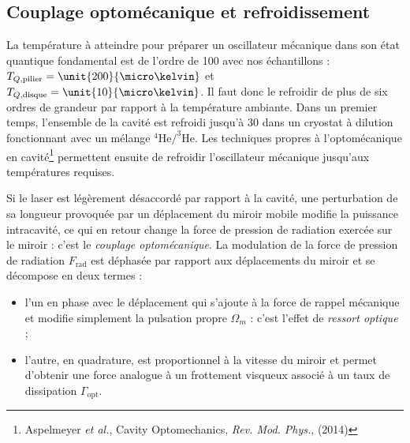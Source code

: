 \documentclass[12pt,a4paper]{article}
\begin{document}
\subsection{Couplage optomécanique et refroidissement}
\label{sec:optomechanics}

La température à atteindre pour préparer un oscillateur mécanique dans son état quantique fondamental est de l'ordre de \unit{100}{\micro\kelvin} avec nos échantillons : $T_{Q,\mathrm{pilier}} = \unit{200}{\micro\kelvin}$ et $T_{Q,\mathrm{disque}} = \unit{10}{\micro\kelvin}$.
Il faut donc le refroidir de plus de six ordres de grandeur par rapport à la température ambiante.
Dans un premier temps, l'ensemble de la cavité est refroidi jusqu'à \unit{30}{\milli\kelvin} dans un cryostat à dilution fonctionnant avec un mélange $\mathrm{^4He/^3He}$.
Les techniques propres à l'optomécanique en cavité\footnote{Aspelmeyer \textit{et al.}, Cavity Optomechanics, \textit{Rev. Mod. Phys.}, (2014)} permettent ensuite de refroidir l'oscillateur mécanique jusqu'aux températures requises.

Si le laser est légèrement désaccordé par rapport à la cavité, une perturbation de sa longueur provoquée par un déplacement du miroir mobile modifie la puissance intracavité, ce qui en retour change la force de pression de radiation exercée sur le miroir : c'est le \textit{couplage optomécanique}.
La modulation de la force de pression de radiation $F_\mathrm{rad}$ est déphasée par rapport aux déplacements du miroir et se décompose en deux termes :
\begin{itemize}
\item l'un en phase avec le déplacement qui s'ajoute à la force de rappel mécanique et modifie simplement la pulsation propre $\Omega_m$ : c'est l'effet de \textit{ressort optique} ;
\item l'autre, en quadrature, est proportionnel à la vitesse du miroir et permet d'obtenir une force analogue à un frottement visqueux associé à un taux de dissipation $\Gamma_\mathrm{opt}$.
\end{itemize}
\end{document}
